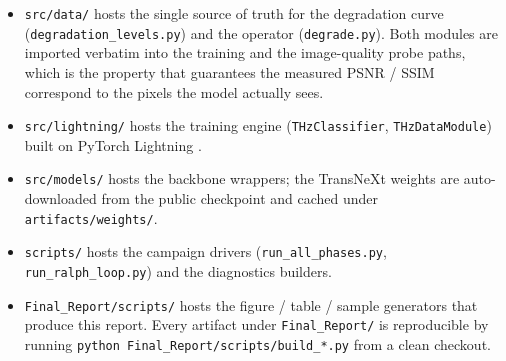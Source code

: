 \begin{itemize}
  \item \texttt{src/data/} hosts the single source of truth for the
        degradation curve (\texttt{degradation\_levels.py}) and the operator
        (\texttt{degrade.py}). Both modules are imported verbatim into the
        training and the image-quality probe paths, which is the property
        that guarantees the measured PSNR / SSIM correspond to the pixels
        the model actually sees.
  \item \texttt{src/lightning/} hosts the training engine
        (\texttt{THzClassifier}, \texttt{THzDataModule}) built on PyTorch
        Lightning \cite{falcon2019lightning}.
  \item \texttt{src/models/} hosts the backbone wrappers; the TransNeXt
        weights are auto-downloaded from the public checkpoint and cached
        under \texttt{artifacts/weights/}.
  \item \texttt{scripts/} hosts the campaign drivers (\texttt{run\_all\_phases.py},
        \texttt{run\_ralph\_loop.py}) and the diagnostics builders.
  \item \texttt{Final\_Report/scripts/} hosts the figure / table / sample
        generators that produce this report. Every artifact under
        \texttt{Final\_Report/} is reproducible by running
        \texttt{python Final\_Report/scripts/build\_*.py} from a clean
        checkout.
\end{itemize}
